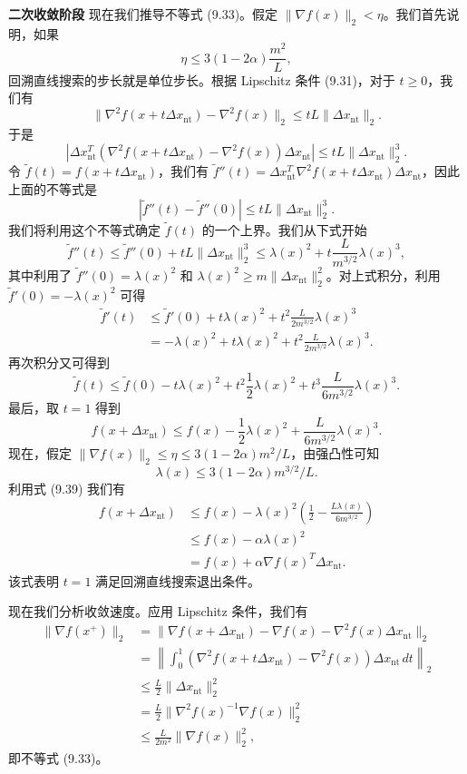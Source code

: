 \documentclass[UTF8, 12pt, fontset=fandol, oneside]{ctexart}
\begin{document}
\noindent\textbf{二次收敛阶段}\quad
现在我们推导不等式 (9.33)。假定 $\|\nabla f(x)\|_2<\eta$。我们首先说明，如果
\[
\eta\leq 3(1-2\alpha)\frac{m^2}{L},
\]
回溯直线搜索的步长就是单位步长。根据 Lipschitz 条件 (9.31)，对于 $t\geq0$，我们有
\[
\|\nabla^2f(x+t\Delta x_{\mathrm{nt}})-\nabla^2f(x)\|_2
\leq tL\|\Delta x_{\mathrm{nt}}\|_2.
\]
于是
\[
\left|\Delta x_{\mathrm{nt}}^T(\nabla^2f(x+t\Delta x_{\mathrm{nt}})-\nabla^2f(x))\Delta x_{\mathrm{nt}}\right|
\leq tL\|\Delta x_{\mathrm{nt}}\|_2^3.
\]
令 $\tilde{f}(t)=f(x+t\Delta x_{\mathrm{nt}})$，我们有 $\tilde{f}''(t)=\Delta x_{\mathrm{nt}}^T\nabla^2f(x+t\Delta x_{\mathrm{nt}})\Delta x_{\mathrm{nt}}$，因此上面的不等式是
\[
|\tilde{f}''(t)-\tilde{f}''(0)|\leq tL\|\Delta x_{\mathrm{nt}}\|_2^3.
\]
我们将利用这个不等式确定 $\tilde{f}(t)$ 的一个上界。我们从下式开始
\[
\tilde{f}''(t)\leq\tilde{f}''(0)+tL\|\Delta x_{\mathrm{nt}}\|_2^3
\leq\lambda(x)^2+t\frac{L}{m^{3/2}}\lambda(x)^3,
\]
其中利用了 $\tilde{f}''(0)=\lambda(x)^2$ 和 $\lambda(x)^2\geq m\|\Delta x_{\mathrm{nt}}\|_2^2$。对上式积分，利用 $\tilde{f}'(0)=-\lambda(x)^2$ 可得
\[
\begin{aligned}
\tilde{f}'(t)
&\leq \tilde{f}'(0)+t\lambda(x)^2+t^2\frac{L}{2m^{3/2}}\lambda(x)^3\\
&=-\lambda(x)^2+t\lambda(x)^2+t^2\frac{L}{2m^{3/2}}\lambda(x)^3.
\end{aligned}
\]
再次积分又可得到
\[
\tilde{f}(t)\leq\tilde{f}(0)-t\lambda(x)^2+t^2\frac{1}{2}\lambda(x)^2+t^3\frac{L}{6m^{3/2}}\lambda(x)^3.
\]
最后，取 $t=1$ 得到
\begin{equation}
f(x+\Delta x_{\mathrm{nt}})
\leq f(x)-\frac{1}{2}\lambda(x)^2+\frac{L}{6m^{3/2}}\lambda(x)^3.
\tag{9.39}
\end{equation}
现在，假定 $\|\nabla f(x)\|_2\leq\eta\leq3(1-2\alpha)m^2/L$，由强凸性可知
\[
\lambda(x)\leq 3(1-2\alpha)m^{3/2}/L.
\]
利用式 (9.39) 我们有
\[
\begin{aligned}
f(x+\Delta x_{\mathrm{nt}})
&\leq f(x)-\lambda(x)^2\left(\frac{1}{2}-\frac{L\lambda(x)}{6m^{3/2}}\right)\\
&\leq f(x)-\alpha\lambda(x)^2\\
&=f(x)+\alpha\nabla f(x)^T\Delta x_{\mathrm{nt}}.
\end{aligned}
\]
该式表明 $t=1$ 满足回溯直线搜索退出条件。

现在我们分析收敛速度。应用 Lipschitz 条件，我们有
\[
\begin{aligned}
\|\nabla f(x^+)\|_2
&=\|\nabla f(x+\Delta x_{\mathrm{nt}})-\nabla f(x)-\nabla^2f(x)\Delta x_{\mathrm{nt}}\|_2\\
&=\left\|\int_0^1(\nabla^2f(x+t\Delta x_{\mathrm{nt}})-\nabla^2f(x))\Delta x_{\mathrm{nt}}\,dt\right\|_2\\
&\leq \frac{L}{2}\|\Delta x_{\mathrm{nt}}\|_2^2\\
&=\frac{L}{2}\|\nabla^2f(x)^{-1}\nabla f(x)\|_2^2\\
&\leq \frac{L}{2m^2}\|\nabla f(x)\|_2^2,
\end{aligned}
\]
即不等式 (9.33)。
\end{document}
